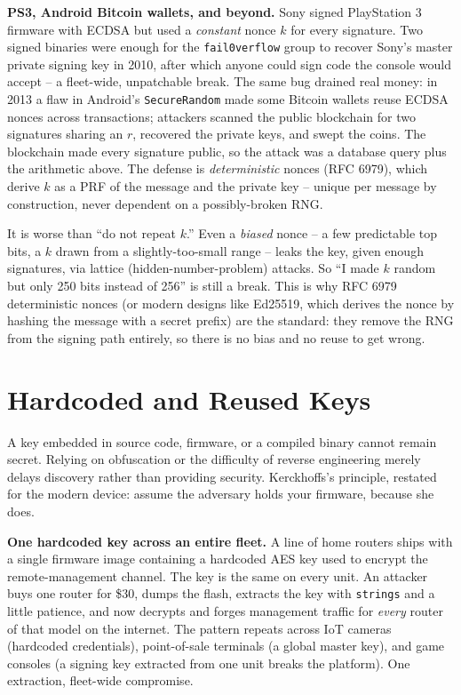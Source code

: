 \begin{attackbox}
\textbf{PS3, Android Bitcoin wallets, and beyond.} Sony signed PlayStation 3 firmware with ECDSA but used a \emph{constant} nonce $k$ for every signature. Two signed binaries were enough for the \texttt{fail0verflow} group to recover Sony's master private signing key in 2010, after which anyone could sign code the console would accept -- a fleet-wide, unpatchable break. The same bug drained real money: in 2013 a flaw in Android's \texttt{SecureRandom} made some Bitcoin wallets reuse ECDSA nonces across transactions; attackers scanned the public blockchain for two signatures sharing an $r$, recovered the private keys, and swept the coins. The blockchain made every signature public, so the attack was a database query plus the arithmetic above. The defense is \emph{deterministic} nonces (RFC 6979), which derive $k$ as a PRF of the message and the private key -- unique per message by construction, never dependent on a possibly-broken RNG.
\end{attackbox}

\begin{trapbox}
It is worse than ``do not repeat $k$.'' Even a \emph{biased} nonce -- a few predictable top bits, a $k$ drawn from a slightly-too-small range -- leaks the key, given enough signatures, via lattice (hidden-number-problem) attacks. So ``I made $k$ random but only 250 bits instead of 256'' is still a break. This is why RFC 6979 deterministic nonces (or modern designs like Ed25519, which derives the nonce by hashing the message with a secret prefix) are the standard: they remove the RNG from the signing path entirely, so there is no bias and no reuse to get wrong.
\end{trapbox}

\section{Hardcoded and Reused Keys}
\label{ch38:hardcoded-keys}

A key embedded in source code, firmware, or a compiled binary cannot remain secret. Relying on obfuscation or the difficulty of reverse engineering merely delays discovery rather than providing security. Kerckhoffs's principle, restated for the modern device: assume the adversary holds your firmware, because she does.

\begin{attackbox}
\textbf{One hardcoded key across an entire fleet.} A line of home routers ships with a single firmware image containing a hardcoded AES key used to encrypt the remote-management channel. The key is the same on every unit. An attacker buys one router for \$30, dumps the flash, extracts the key with \texttt{strings} and a little patience, and now decrypts and forges management traffic for \emph{every} router of that model on the internet. The pattern repeats across IoT cameras (hardcoded credentials), point-of-sale terminals (a global master key), and game consoles (a signing key extracted from one unit breaks the platform). One extraction, fleet-wide compromise.
\end{attackbox}

